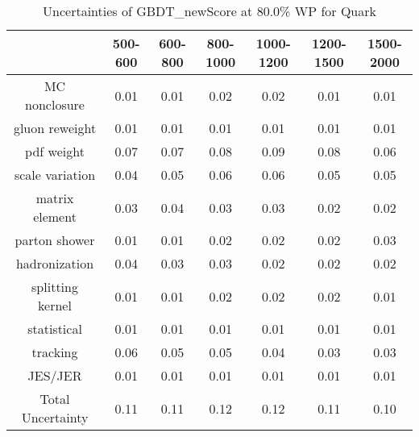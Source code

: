 \begin{table}
\centering
\caption{Uncertainties of GBDT_newScore at 80.0\% WP for Quark}
\label{tab:syst_GBDT_newScore_0.8_Quark}
\begin{tabular}{ccccccc}
\toprule
{} &  500-600 &  600-800 &  800-1000 &  1000-1200 &  1200-1500 &  1500-2000 \\
\midrule
MC nonclosure     &     0.01 &     0.01 &      0.02 &       0.02 &       0.01 &       0.01 \\
gluon reweight    &     0.01 &     0.01 &      0.01 &       0.01 &       0.01 &       0.01 \\
pdf weight        &     0.07 &     0.07 &      0.08 &       0.09 &       0.08 &       0.06 \\
scale variation   &     0.04 &     0.05 &      0.06 &       0.06 &       0.05 &       0.05 \\
matrix element    &     0.03 &     0.04 &      0.03 &       0.03 &       0.02 &       0.02 \\
parton shower     &     0.01 &     0.01 &      0.02 &       0.02 &       0.02 &       0.03 \\
hadronization     &     0.04 &     0.03 &      0.03 &       0.02 &       0.02 &       0.02 \\
splitting kernel  &     0.01 &     0.01 &      0.02 &       0.02 &       0.02 &       0.01 \\
statistical       &     0.01 &     0.01 &      0.01 &       0.01 &       0.01 &       0.01 \\
tracking          &     0.06 &     0.05 &      0.05 &       0.04 &       0.03 &       0.03 \\
JES/JER           &     0.01 &     0.01 &      0.01 &       0.01 &       0.01 &       0.01 \\
Total Uncertainty &     0.11 &     0.11 &      0.12 &       0.12 &       0.11 &       0.10 \\
\bottomrule
\end{tabular}
\end{table}
